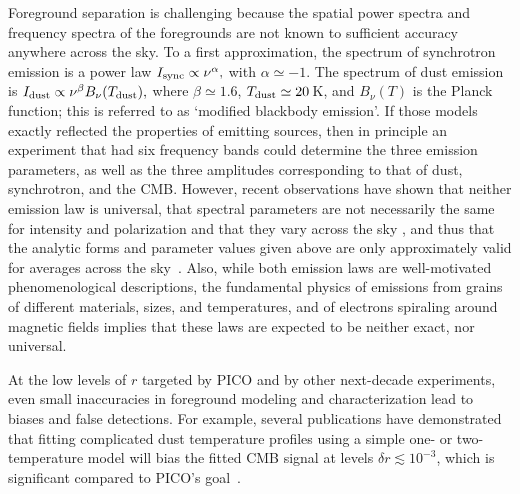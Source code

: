 \documentclass[PICOReport.tex]{subfiles}
\begin{document}
Foreground separation is challenging because the spatial power spectra and frequency spectra of the foregrounds are not known to sufficient accuracy anywhere across the sky.
To a first approximation, the spectrum of synchrotron emission is a power law $I_{\rm sync} \propto \nu^{\alpha},$ with $\alpha \simeq -1$.  The spectrum of dust emission is $I_{\rm dust} \propto \nu^{\beta} B_\nu(T_{\rm dust}),$ where $\beta \simeq 1.6$, $T_{\rm dust} \simeq 20$\,K, and $B_\nu(T)$ is the Planck function; this is referred to as `modified blackbody emission'. If those models exactly reflected the properties of emitting sources, then in principle an experiment that had six frequency bands could determine the three emission parameters, as well as the three amplitudes corresponding to that of dust, synchrotron, and the CMB. However, recent observations have shown that neither emission law is universal, that spectral parameters are not necessarily the same for intensity and polarization and that they vary across the sky \cite{SPASS_2018_variation,fuskeland2014_wmap_variation,planck_2013_xi}, and thus that the analytic forms and parameter values given above are only approximately valid for averages across the sky~\citep{chluba2017foregrounds}. Also, while both emission laws are well-motivated phenomenological descriptions, the fundamental physics of emissions from grains of different materials, sizes, and temperatures, and of electrons spiraling around magnetic fields implies that these laws are expected to be neither exact, nor universal. 

At the low levels of $r$ targeted by PICO and by other next-decade experiments, even small inaccuracies in foreground modeling and characterization lead to biases and false detections. For example, several publications have demonstrated that fitting complicated dust temperature profiles using a simple one- or two-temperature model will bias the fitted CMB signal at levels $\delta r \lesssim 10^{-3}$, which is significant compared to PICO's goal~\citep{fantaye2011,armitage-caplan2012,kogut_fixsen2016,remazeilles/etal:2016,stompor2016}. 

\end{document}
